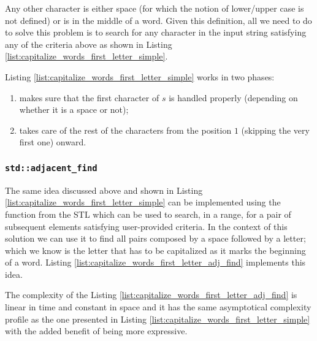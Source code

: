 Any other character is either space (for which the notion of lower/upper case is not defined) or is in the middle of a word. 
Given this definition, all we need to do to solve this problem is to search for any character in the input string satisfying any of the criteria above as shown in Listing \ref{list:capitalize_words_first_letter_simple}.



Listing \ref{list:capitalize_words_first_letter_simple} works in two phases:
\begin{enumerate}
	\item makes sure that the first character of $s$ is handled properly (depending on whether it is a space or not);
	\item takes care of the rest of the characters from the position $1$ (skipping the very first one) onward.
\end{enumerate}

\subsubsection{\texttt{std::adjacent\_find}}
The same idea discussed above and shown in Listing \ref{list:capitalize_words_first_letter_simple} can be implemented using the function \cite{cit::std::adjancefind} from the STL which can be used to search, in a range, for a pair of subsequent elements satisfying user-provided criteria. In the context of this solution we can use it to find all pairs composed by a space followed by a letter; which we know is the letter that has to be capitalized as it marks the beginning of a word.
Listing \ref{list:capitalize_words_first_letter_adj_find} implements this idea. 



The complexity of the Listing \ref{list:capitalize_words_first_letter_adj_find}  is linear in time and constant in space and it has the same asymptotical complexity profile as the one presented in Listing \ref{list:capitalize_words_first_letter_simple} with the added benefit of being more expressive.

